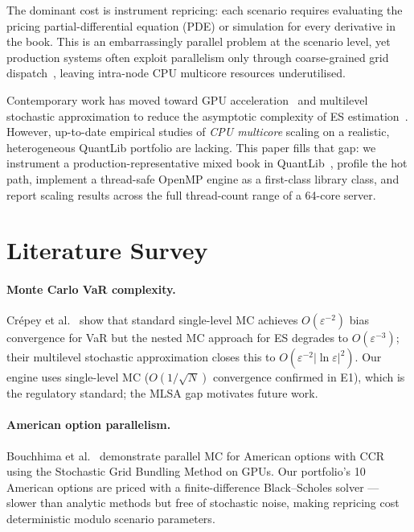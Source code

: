 \documentclass[11pt,twocolumn]{article}
\begin{document}
The dominant cost is instrument repricing: each scenario requires
evaluating the pricing partial-differential equation (PDE) or
simulation for every derivative in the book.  This is an
embarrassingly parallel problem at the scenario level, yet
production systems often exploit parallelism only through coarse-grained
grid dispatch~\cite{fusai2006}, leaving intra-node CPU multicore
resources underutilised.

Contemporary work has moved toward GPU acceleration~\cite{dixon2011,
dessain2024} and multilevel stochastic approximation to reduce the
asymptotic complexity of ES estimation~\cite{crepey2025}.  However,
up-to-date empirical studies of \emph{CPU multicore} scaling on a
realistic, heterogeneous QuantLib portfolio are lacking.
This paper fills that gap: we instrument a production-representative
mixed book in QuantLib~\cite{quantlib_repo}, profile the hot path,
implement a thread-safe OpenMP engine as a first-class library class,
and report scaling results across the full thread-count range of a
64-core server.

\section{Literature Survey}

\paragraph{Monte Carlo VaR complexity.}
Cr{\'e}pey et al.~\cite{crepey2025} show that standard single-level MC
achieves $O(\varepsilon^{-2})$ bias convergence for VaR but the nested
MC approach for ES degrades to $O(\varepsilon^{-3})$; their multilevel
stochastic approximation closes this to
$O(\varepsilon^{-2}|\ln\varepsilon|^2)$.
Our engine uses single-level MC
($O(1/\sqrt{N})$ convergence confirmed in E1), which is the regulatory
standard; the MLSA gap motivates future work.

\paragraph{American option parallelism.}
Bouchhima et al.~\cite{bouchhima2024} demonstrate parallel MC for
American options with CCR using the Stochastic Grid Bundling Method
on GPUs.  Our portfolio's 10 American options are priced with a
finite-difference Black--Scholes solver --- slower than
analytic methods but free of stochastic noise, making repricing
cost deterministic modulo scenario parameters.
\end{document}
